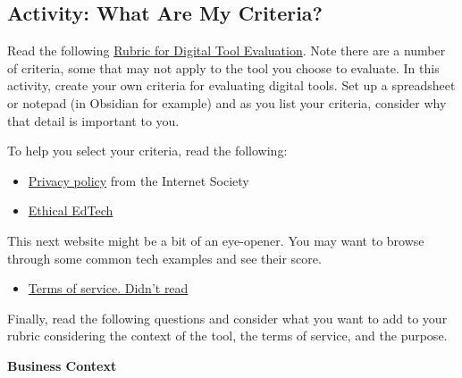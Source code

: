 \documentclass[
]{book}
\providecommand{\tightlist}{%
  \setlength{\itemsep}{0pt}\setlength{\parskip}{0pt}}
\theoremstyle{definition}
\theoremstyle{definition}
\theoremstyle{definition}
\theoremstyle{definition}
\theoremstyle{remark}
\begin{document}
\hypertarget{activity-what-are-my-criteria}{%
\subsection*{Activity: What Are My Criteria?}\label{activity-what-are-my-criteria}}

\begin{reflect}
Read the following \href{assets/u4/U4_Rubric-for-Digital-Tool-Evaluation.pdf}{Rubric for Digital Tool Evaluation}. Note there are a number of criteria, some that may not apply to the tool you choose to evaluate. In this activity, create your own criteria for evaluating digital tools. Set up a spreadsheet or notepad (in Obsidian for example) and as you list your criteria, consider why that detail is important to you.

To help you select your criteria, read the following:

\begin{itemize}
\tightlist
\item
  \href{https://www.internetsociety.org/policybriefs/privacy/}{Privacy policy} from the Internet Society\\
\item
  \href{https://ethicaledtech.info/wiki/Meta:About}{Ethical EdTech}
\end{itemize}

This next website might be a bit of an eye-opener. You may want to browse through some common tech examples and see their score.

\begin{itemize}
\tightlist
\item
  \href{https://tosdr.org/}{Terms of service. Didn't read}
\end{itemize}

Finally, read the following questions and consider what you want to add to your rubric considering the context of the tool, the terms of service, and the purpose.

\textbf{Business Context}


\end{reflect}
\end{document}
